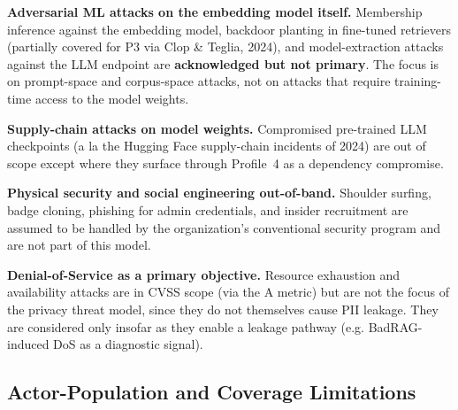 \documentclass[a4paper,12pt]{report}
\begin{document}
\begin{limitbox}
\textbf{Adversarial ML attacks on the embedding model itself.}
Membership inference against the embedding model, backdoor planting in
fine-tuned retrievers (partially covered for P3 via Clop \& Teglia, 2024),
and model-extraction attacks against the LLM endpoint are
\textbf{acknowledged but not primary}. The focus is on prompt-space and
corpus-space attacks, not on attacks that require training-time access to
the model weights.

\textbf{Supply-chain attacks on model weights.} Compromised pre-trained
LLM checkpoints (a la the Hugging Face supply-chain incidents of 2024)
are out of scope except where they surface through Profile~4 as a
dependency compromise.

\textbf{Physical security and social engineering out-of-band.} Shoulder
surfing, badge cloning, phishing for admin credentials, and insider
recruitment are assumed to be handled by the organization's conventional
security program and are not part of this model.

\textbf{Denial-of-Service as a primary objective.} Resource exhaustion
and availability attacks are in CVSS scope (via the A metric) but are
not the focus of the privacy threat model, since they do not themselves
cause PII leakage. They are considered only insofar as they enable
a leakage pathway (e.g. BadRAG-induced DoS as a diagnostic signal).
\end{limitbox}

\subsection{Actor-Population and Coverage Limitations}
\end{document}
